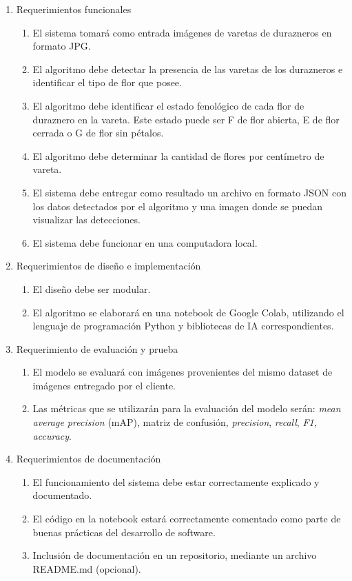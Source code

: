 \documentclass[
11pt, %
codirector, %
]{charter}
\begin{document}
\begin{enumerate}
	\item Requerimientos funcionales
		\begin{enumerate}
			\item El sistema tomará como entrada imágenes de varetas de durazneros en formato JPG.			
			\item El algoritmo debe detectar la presencia de las varetas de los durazneros e identificar el tipo de flor que posee.			        
			\item El algoritmo debe identificar el estado fenológico de cada flor de duraznero en la vareta. Este estado puede ser F de flor abierta, E de flor cerrada o G de flor sin pétalos. 
			\item El algoritmo debe determinar la cantidad de flores por centímetro de vareta.
			\item El sistema debe entregar como resultado un archivo en formato JSON con los datos detectados por el algoritmo y una imagen donde se puedan visualizar las detecciones.
			\item El sistema debe funcionar en una computadora local.
		\end{enumerate}
	\item Requerimientos de diseño e implementación
		\begin{enumerate}
			\item El diseño debe ser modular.
			\item El algoritmo se elaborará en una notebook de Google Colab, utilizando el lenguaje de  programación Python y bibliotecas de IA correspondientes. 
		\end{enumerate}
	\item Requerimiento de evaluación y prueba
	\begin{enumerate}
			\item El modelo se evaluará con imágenes provenientes del mismo dataset de imágenes entregado por el cliente.
			 \item Las métricas que se utilizarán para la evaluación del modelo serán: \textit{mean average precision} (mAP), matriz de confusión, \textit{precision}, \textit{recall}, \textit{F1}, \textit{accuracy}.
		\end{enumerate}
	\item Requerimientos de documentación
	\begin{enumerate}
			\item El funcionamiento del sistema debe estar correctamente explicado y documentado.
			 \item El código en la notebook estará correctamente comentado como parte de buenas prácticas del desarrollo de software.
			 \item Inclusión de documentación en un repositorio, mediante un archivo README.md (opcional).
		\end{enumerate}
\end{enumerate}
\end{document}
